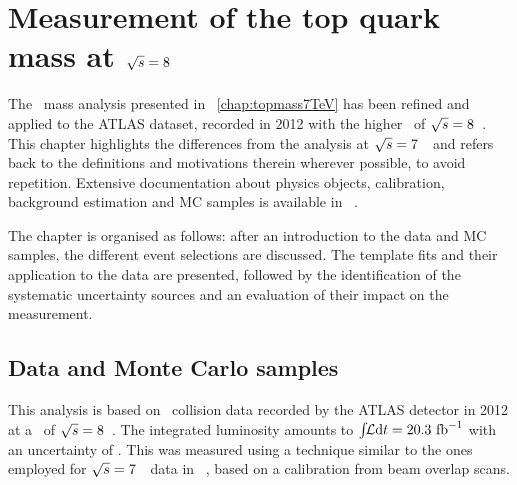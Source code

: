 \chapter{Measurement of the top quark mass at \texorpdfstring{${\sqrt{s}}=8$}{sqrt(s)=8}~\TeV}
\label{chap:topmass8TeV}
%
The \tquark\ mass analysis presented in \chap~\ref{chap:topmass7TeV} has been refined and applied to the \gls{ATLAS} dataset, recorded in 2012 with the higher \cme\ of ${\sqrt{s}}=8$~\TeV. This chapter highlights the differences from the analysis at ${\sqrt{s}}=7$~\TeV\ and refers back to the definitions and motivations therein wherever possible, to avoid repetition. Extensive documentation about physics objects, calibration, background estimation and \gls{MC} samples is available in ~\cite{Acharya:1563201}.

The chapter is organised as follows: 
%
after an introduction to the data and \gls{MC} samples, the different event selections are discussed.
%
The template fits and their application to the data are presented, followed by the identification of the systematic uncertainty sources and an evaluation of their impact on the measurement. 










\section{Data and Monte Carlo samples}
\label{sect:dataMC8TeV}
%
This analysis is based on \pp\ collision data recorded by the \gls{ATLAS} detector in 2012 at a \cme\ of ${\sqrt{s}}=8$~\TeV. The integrated luminosity amounts to $\int\!\!{\mathcal L}\mathrm{d}t=20.3~\mathrm{fb}^{-1}$ with an uncertainty of \atlumounc. This was measured using a technique similar to the ones employed for ${\sqrt{s}}=7$~\TeV\ data in ~\cite{Aad:2013ucp}, based on a calibration from beam overlap scans. 


